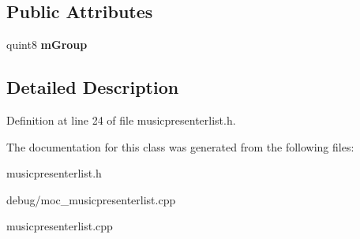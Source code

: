 \subsection*{Public Attributes}
\begin{DoxyCompactItemize}
\item 
\mbox{\label{class_music_presenter_list_af97aa7d1f5d01eb41f7c7b4c9d92e026}} 
quint8 {\bfseries m\+Group}
\end{DoxyCompactItemize}


\subsection{Detailed Description}


Definition at line 24 of file musicpresenterlist.\+h.



The documentation for this class was generated from the following files\+:\begin{DoxyCompactItemize}
\item 
musicpresenterlist.\+h\item 
debug/moc\+\_\+musicpresenterlist.\+cpp\item 
musicpresenterlist.\+cpp\end{DoxyCompactItemize}
